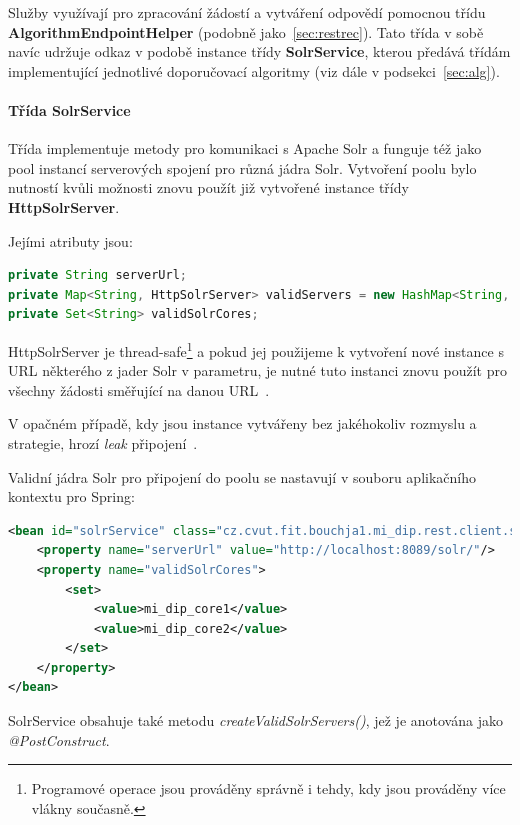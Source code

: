 \documentclass[thesis=M,czech]{FITthesis}[2014/05/07]
\begin{document}
Služby využívají pro zpracování žádostí a vytváření odpovědí pomocnou třídu \textbf{AlgorithmEndpointHelper} (podobně jako~\ref{sec:restrec}). Tato třída v sobě navíc udržuje odkaz v podobě instance třídy \textbf{SolrService}, kterou předává třídám implementující jednotlivé doporučovací algoritmy (viz dále v podsekci~\ref{sec:alg}). 

\paragraph{Třída SolrService}
	
Třída implementuje metody pro komunikaci s Apache Solr a funguje též jako pool instancí serverových spojení pro různá jádra Solr. Vytvoření poolu bylo nutností kvůli možnosti znovu použít již vytvořené instance třídy \textbf{HttpSolrServer}.

Jejími atributy jsou:

\begin{lstlisting}[language=java]
private String serverUrl;
private Map<String, HttpSolrServer> validServers = new HashMap<String, HttpSolrServer>();
private Set<String> validSolrCores;
\end{lstlisting}

HttpSolrServer je thread-safe\footnote{Programové operace jsou prováděny správně i tehdy, kdy jsou prováděny více vlákny současně.} a pokud jej použijeme k vytvoření nové instance s URL některého z jader Solr v parametru, je nutné tuto instanci znovu použít pro všechny žádosti směřující na danou URL~\cite{solrj}. 

V opačném případě, kdy jsou instance vytvářeny bez jakéhokoliv rozmyslu a strategie, hrozí \emph{leak} připojení~\cite{metawerx}.

Validní jádra Solr pro připojení do poolu se nastavují v souboru aplikačního kontextu pro Spring:

\begin{lstlisting}[language=xml]
<bean id="solrService" class="cz.cvut.fit.bouchja1.mi_dip.rest.client.solr.SolrService">
    <property name="serverUrl" value="http://localhost:8089/solr/"/>
    <property name="validSolrCores">
        <set>
            <value>mi_dip_core1</value>
            <value>mi_dip_core2</value>
        </set>
    </property>        
</bean>  
\end{lstlisting}

SolrService obsahuje také metodu \emph{createValidSolrServers()}, jež je anotována jako \emph{@PostConstruct}.
\end{document}
